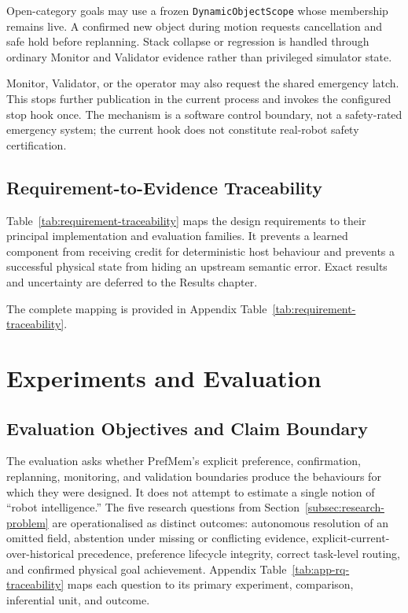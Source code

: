 \documentclass{article}
\begin{document}
Open-category goals may use a frozen \texttt{DynamicObjectScope} whose
membership remains live. A confirmed new object during motion requests
cancellation and safe hold before replanning. Stack collapse or regression is
handled through ordinary Monitor and Validator evidence rather than privileged
simulator state.

Monitor, Validator, or the operator may also request the shared emergency
latch. This stops further publication in the current process and invokes the
configured stop hook once. The mechanism is a software control boundary, not a
safety-rated emergency system; the current hook does not constitute real-robot
safety certification.

\subsection{Requirement-to-Evidence Traceability}
\label{subsec:methodology-traceability}

Table~\ref{tab:requirement-traceability} maps the design requirements to their
principal implementation and evaluation families. It prevents a learned
component from receiving credit for deterministic host behaviour and prevents
a successful physical state from hiding an upstream semantic error. Exact
results and uncertainty are deferred to the Results chapter.

The complete mapping is provided in Appendix
Table~\ref{tab:requirement-traceability}.


\section{Experiments and Evaluation}
\label{sec:experiments-evaluation}

\subsection{Evaluation Objectives and Claim Boundary}
\label{subsec:evaluation-objectives}

The evaluation asks whether PrefMem's explicit preference, confirmation,
replanning, monitoring, and validation boundaries produce the behaviours for
which they were designed. It does not attempt to estimate a single notion of
``robot intelligence.'' The five research questions from
Section~\ref{subsec:research-problem} are operationalised as distinct outcomes:
autonomous resolution of an omitted field, abstention under missing or
conflicting evidence, explicit-current-over-historical precedence, preference
lifecycle integrity, correct task-level routing, and confirmed physical goal
achievement. Appendix Table~\ref{tab:app-rq-traceability} maps each question to
its primary experiment, comparison, inferential unit, and outcome.
\end{document}
